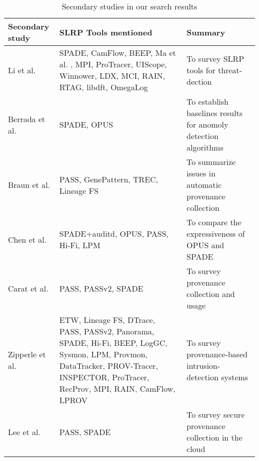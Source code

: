 \begin{table}
\caption{Secondary studies in our search results}
\label{table:secondary-studies}
\renewcommand{\arraystretch}{1.4}
\begin{tabular}{p{}p{}p{}}
Secondary study                             & SLRP Tools mentioned                              & Summary                                                         \\
\midrule
Li et al. \cite{li_threat_2021}             & SPADE, CamFlow, BEEP,
                                              Ma et al. \cite{ma_accurate_2015}, MPI, ProTracer,
                                              UIScope, Winnower, LDX, MCI, RAIN, RTAG, libdft,
                                              OmegaLog                                          & To survey SLRP tools for threat-dection                         \\
Berrada et al. \cite{berrada_baseline_2020} & SPADE, OPUS                                       & To establish baselines results for anomoly detection algorithms \\
Braun et al. \cite{hutchison_issues_2006}   & PASS, GenePattern, TREC, Lineage FS               & To summarize issues in automatic provenance collection          \\
Chen et al. \cite{chan_expressiveness_2017} & SPADE+auditd, OPUS, PASS, Hi-Fi, LPM              & To compare the expressiveness of OPUS and SPADE                 \\
Carat et al. \cite{carata_primer_2014}      & PASS, PASSv2, SPADE                               & To survey provenance collection and usage                       \\
Zipperle et al.
\cite{zipperle_provenance-based_2022}       & ETW, Lineage FS, DTrace, PASS, PASSv2, Panorama,
                                              SPADE, Hi-Fi, BEEP, LogGC, Sysmon, LPM, Provmon,
                                              DataTracker, PROV-Tracer, INSPECTOR, ProTracer,
                                              RecProv, MPI, RAIN, CamFlow, LPROV                & To survey provenance-based intrusion-detection systems          \\
Lee et al. \cite{lee_towards_2015}          & PASS, SPADE                                       & To survey secure provenance collection in the cloud             \\
\end{tabular}
\end{table}


